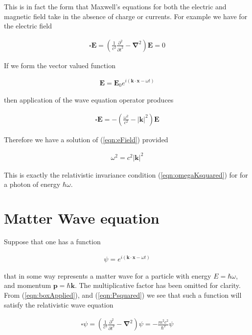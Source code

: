 \documentclass[]{eliblog}
\newcommand{\Abs}[1]{{\left\lvert{#1}\right\rvert}}
\newcommand{\BE}[0]{\mathbf{E}}
\newcommand{\Bk}[0]{\mathbf{k}}
\newcommand{\Bp}[0]{\mathbf{p}}
\newcommand{\Bx}[0]{\mathbf{x}}
\newcommand{\spacegrad}[0]{\boldsymbol{\nabla}}
\newcommand{\delambertian}[0]{\square}
\begin{document}
This is in fact the form that Maxwell's equations for both the electric and magnetic field take in the absence of charge or currents.
For example we have for the electric field

\begin{align}\label{eqn:eField}
\delambertian \BE = \left( \frac{1}{c^2}\frac{\partial^2}{{\partial t}^2} - \spacegrad^2 \right) \BE = 0
\end{align}

If we form the vector valued function

\begin{align}\label{eqn:testSolutionE}
\BE = \BE_0 e^{ i( \Bk \cdot \Bx - \omega t ) }
\end{align}

then application of the wave equation operator produces

\begin{align}\label{eqn:boxApplied}
\delambertian \BE = -\left( \frac{\omega^2}{c^2} - \Abs{\Bk}^2 \right) \BE
\end{align}

Therefore we have a solution of (\ref{eqn:eField}) provided

\begin{align}
\omega^2 = c^2 \Abs{\Bk}^2
\end{align}

This is exactly the relativistic invariance condition (\ref{eqn:omegaKsquared}) for for a photon of energy $\hbar \omega$.

\section{Matter Wave equation}

Suppose that one has a function

\begin{align}\label{eqn:waveFunction}
\psi = e^{ i( \Bk \cdot \Bx - \omega t) }
\end{align}

that in some way represents a matter wave for a particle with energy $E = \hbar \omega$, and momentum
 $\Bp = \hbar \Bk$.  The multiplicative factor has been omitted for clarity.
From (\ref{eqn:boxApplied}), and 
(\ref{eqn:Psquared})
we see that such a function will satisfy the relativistic wave equation

\begin{align}
\delambertian \psi = \left( \frac{1}{c^2}\frac{\partial^2}{{\partial t}^2} - \spacegrad^2 \right) \psi = - \frac{m^2 c^2}{\hbar^2} \psi
\end{align}
\end{document}
